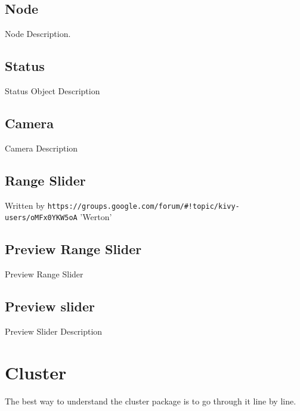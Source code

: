 \subsection{Node}
Node Description.

\subsection{Status}
Status Object Description

\subsection{Camera}
Camera Description

\subsection{Range Slider}
Written by \verb|https://groups.google.com/forum/#!topic/kivy-users/oMFx0YKW5oA| 'Werton'

\subsection{Preview Range Slider}
Preview Range Slider

\subsection{Preview slider}
Preview Slider Description

\section{Cluster}
The best way to understand the cluster package is to go through it line by line.

